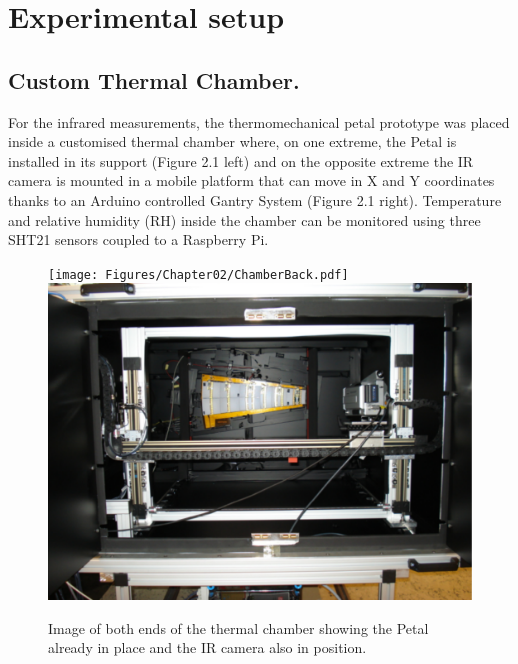 \pagestyle{standard}

\chapter{Experimental setup}

	\thispagestyle{chapter-first-page}
	
	\section{Custom Thermal Chamber.}
	
		For the infrared measurements, the thermomechanical petal prototype was placed inside a customised thermal chamber where, on one extreme, the Petal is installed in its support (Figure 2.1 left) and on the opposite extreme the IR camera is mounted in a mobile platform that can move in X and Y coordinates thanks to an Arduino controlled Gantry System (Figure 2.1 right). Temperature and relative humidity (RH) inside the chamber can be monitored using three SHT21 sensors coupled to a Raspberry Pi.
		
		\begin{figure}[ht!]
			\centering
			\captionsetup{justification=centering,margin=2cm}
			\texttt{[image: Figures/Chapter02/ChamberBack.pdf]}
			\includegraphics[scale=0.26]{Figures/Chapter02/CamberFront.pdf}
			\caption{\label{fig5} Image of both ends of the thermal chamber showing the Petal already in place and the IR camera also in position.}
		\end{figure}
		
